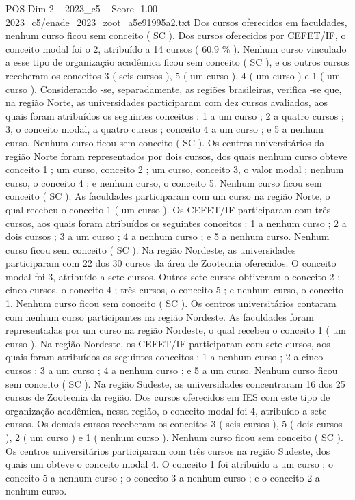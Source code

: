 \begin{textsample}{POS Dim 2 – 2023\_c5 – Score -1.00 – 2023\_c5/enade\_2023\_zoot\_a5e91995a2.txt}
Dos cursos oferecidos em faculdades, nenhum curso ficou sem conceito ( SC ).
Dos cursos oferecidos por CEFET/IF, o conceito modal foi o 2, atribuído a 14 cursos ( 60,9 \% ).
Nenhum curso vinculado a esse tipo de organização acadêmica ficou sem conceito ( SC ), e os outros cursos receberam os conceitos 3 ( seis cursos ), 5 ( um curso ), 4 ( um curso ) e 1 ( um curso ).
Considerando -se, separadamente, as regiões brasileiras, verifica -se que, na região Norte, as universidades participaram com dez cursos avaliados, aos quais foram atribuídos os seguintes conceitos : 1 a um curso ; 2 a quatro cursos ; 3, o conceito modal, a quatro cursos ; conceito 4 a um curso ; e 5 a nenhum curso.
Nenhum curso ficou sem conceito ( SC ).
Os centros universitários da região Norte foram representados por dois cursos, dos quais nenhum curso obteve conceito 1 ; um curso, conceito 2 ; um curso, conceito 3, o valor modal ; nenhum curso, o conceito 4 ; e nenhum curso, o conceito 5.
Nenhum curso ficou sem conceito ( SC ).
As faculdades participaram com um curso na região Norte, o qual recebeu o conceito 1 ( um curso ).
Os CEFET/IF participaram com três cursos, aos quais foram atribuídos os seguintes conceitos : 1 a nenhum curso ; 2 a dois cursos ; 3 a um curso ; 4 a nenhum curso ; e 5 a nenhum curso.
Nenhum curso ficou sem conceito ( SC ).
Na região Nordeste, as universidades participaram com 22 dos 30 cursos da área de Zootecnia oferecidos.
O conceito modal foi 3, atribuído a sete cursos.
Outros sete cursos obtiveram o conceito 2 ; cinco cursos, o conceito 4 ; três cursos, o conceito 5 ; e nenhum curso, o conceito 1.
Nenhum curso ficou sem conceito ( SC ).
Os centros universitários contaram com nenhum curso participantes na região Nordeste.
As faculdades foram representadas por um curso na região Nordeste, o qual recebeu o conceito 1 ( um curso ).
Na região Nordeste, os CEFET/IF participaram com sete cursos, aos quais foram atribuídos os seguintes conceitos : 1 a nenhum curso ; 2 a cinco cursos ; 3 a um curso ; 4 a nenhum curso ; e 5 a um curso.
Nenhum curso ficou sem conceito ( SC ).
Na região Sudeste, as universidades concentraram 16 dos 25 cursos de Zootecnia da região.
Dos cursos oferecidos em IES com este tipo de organização acadêmica, nessa região, o conceito modal foi 4, atribuído a sete cursos.
Os demais cursos receberam os conceitos 3 ( seis cursos ), 5 ( dois cursos ), 2 ( um curso ) e 1 ( nenhum curso ).
Nenhum curso ficou sem conceito ( SC ).
Os centros universitários participaram com três cursos na região Sudeste, dos quais um obteve o conceito modal 4.
O conceito 1 foi atribuído a um curso ; o conceito 5 a nenhum curso ; o conceito 3 a nenhum curso ; e o conceito 2 a nenhum curso.

\end{textsample}

